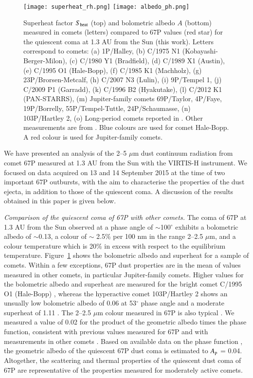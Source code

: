 \documentclass[a4paper,fleqn,usenatbib]{mnras}
\begin{document}
  \begin{figure}
    \texttt{[image: superheat\_rh.png]}
    \texttt{[image: albedo\_ph.png]}
    \caption{Superheat factor $S_{\rm heat}$ (top) and bolometric albedo $A$ (bottom) measured in comets (letters) compared to 67P values (red star) for the quiescent coma at 1.3 AU from the Sun (this work). Letters correspond to comets:
    (a) 1P/Halley, (b) C/1975 N1 (Kobayashi-Berger-Milon), (c) C/1980 Y1 (Bradfield), (d) C/1989 X1 (Austin), (e) C/1995 O1 (Hale-Bopp), (f) C/1985 K1 (Machholz), (g) 23P/Brorsen-Metcalf, (h) C/2007 N3 (Lulin), (i) 9P/Tempel 1, (j) C/2009 P1 (Garradd), (k) C/1996 B2 (Hyakutake), (l) C/2012 K1 (PAN-STARRS), (m) Jupiter-family comets 69P/Taylor, 4P/Faye, 19P/Borrelly, 55P/Tempel-Tuttle, 24P/Schaumasse, (n) 103P/Hartley 2, (o) Long-period comets reported in \citet{Sitko2004}. Other measurements are from \citet{Gehrz1992,Gicquel2012,Mason1998,Mason2001,Meech2011,Sitko2013,Woodward2011,
Protopapa2014,Woodward2015}. Blue colours are used for comet Hale-Bopp. A red colour is used for Jupiter-family comets.}
    \label{fig:comp-comets}
\end{figure}

We have presented an analysis of the 2--5 $\mu$m dust continuum
radiation from comet 67P measured at 1.3 AU from the Sun with the
VIRTIS-H instrument. We focused on data acquired on 13 and 14
September 2015 at the time of two important 67P outbursts, with the
aim to characterise the properties of the dust ejecta, in addition
to those of the quiescent coma. A discussion of
the results obtained in this paper is given below.


{\it Comparison of the quiescent coma of 67P with other comets.} The coma of 67P at 1.3 AU from the Sun observed at a phase angle of $\sim$100$^\circ$ exhibits a bolometric albedo of $\sim$0.13, a colour of $\sim$ 2.5\% per 100 nm in the range 2--2.5 $\mu$m, and a colour temperature which is 20\% in excess with respect to the equilibrium temperature. Figure~\ref{fig:comp-comets} shows the bolometric albedo and superheat for a sample of comets. Within a few exceptions, 67P dust properties are in the mean of values measured in other comets, in particular Jupiter-family comets. Higher values for the bolometric albedo and superheat are measured for the bright comet C/1995 O1 (Hale-Bopp) \citep{Mason2001}, whereas the hyperactive comet 103P/Hartley 2 shows an unsually low bolometric albedo of 0.06 at 53$^{\circ}$ phase angle \citep{Meech2011} and a moderate superheat of 1.11 \citep{Protopapa2014}. The 2--2.5 $\mu$m colour measured in 67P is also typical \citep{Jewitt1986}. We measured a value of 0.02 for the product of the geometric albedo times the phase function, consistent with previous values measured for 67P \citep{Hanner1985} and with measurements in other comets \citep{Hanner1989}. Based on available data on the phase function \citet{Schleicher2010}, the geometric albedo of the quiescent 67P dust coma is estimated to $A_{\rm p}$ = 0.04. Altogether, the scattering and thermal properties of the quiescent dust coma of 67P are representative of the properties measured for moderately active comets.
\end{document}
